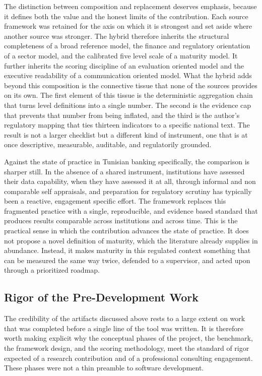 The distinction between composition and replacement deserves emphasis, because it defines both the value and the honest limits of the contribution. Each source framework was retained for the axis on which it is strongest and set aside where another source was stronger. The hybrid therefore inherits the structural completeness of a broad reference model, the finance and regulatory orientation of a sector model, and the calibrated five level scale of a maturity model. It further inherits the scoring discipline of an evaluation oriented model and the executive readability of a communication oriented model. What the hybrid adds beyond this composition is the connective tissue that none of the sources provides on its own. The first element of this tissue is the deterministic aggregation chain that turns level definitions into a single number. The second is the evidence cap that prevents that number from being inflated, and the third is the author's regulatory mapping that ties thirteen indicators to a specific national text. The result is not a larger checklist but a different kind of instrument, one that is at once descriptive, measurable, auditable, and regulatorily grounded.

Against the state of practice in Tunisian banking specifically, the comparison is sharper still. In the absence of a shared instrument, institutions have assessed their data capability, when they have assessed it at all, through informal and non comparable self appraisals, and preparation for regulatory scrutiny has typically been a reactive, engagement specific effort. The framework replaces this fragmented practice with a single, reproducible, and evidence based standard that produces results comparable across institutions and across time. This is the practical sense in which the contribution advances the state of practice. It does not propose a novel definition of maturity, which the literature already supplies in abundance. Instead, it makes maturity in this regulated context something that can be measured the same way twice, defended to a supervisor, and acted upon through a prioritized roadmap.

\subsection{Rigor of the Pre-Development Work}

The credibility of the artifacts discussed above rests to a large extent on work that was completed before a single line of the tool was written. It is therefore worth making explicit why the conceptual phases of the project, the benchmark, the framework design, and the scoring methodology, meet the standard of rigor expected of a research contribution and of a professional consulting engagement. These phases were not a thin preamble to software development.

